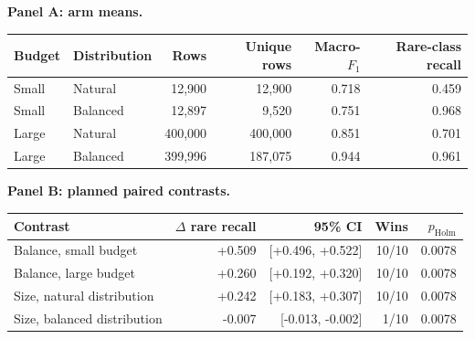 \begin{minipage}{\linewidth}
\centering
\textbf{Panel A: arm means.}\\[3pt]
\begin{tabular}{@{}llrrrr@{}}
\toprule
Budget & Distribution & Rows & Unique rows & Macro-$F_1$ & Rare-class recall \\
\midrule
Small & Natural & 12,900 & 12,900 & 0.718 & 0.459 \\
Small & Balanced & 12,897 & 9,520 & 0.751 & 0.968 \\
Large & Natural & 400,000 & 400,000 & 0.851 & 0.701 \\
Large & Balanced & 399,996 & 187,075 & 0.944 & 0.961 \\
\bottomrule
\end{tabular}
\par\medskip
\textbf{Panel B: planned paired contrasts.}\\[3pt]
\begin{tabular}{@{}lrrrr@{}}
\toprule
Contrast & $\Delta$ rare recall & 95\% CI & Wins & $p_{\mathrm{Holm}}$ \\
\midrule
Balance, small budget & +0.509 & [+0.496, +0.522] & 10/10 & 0.0078 \\
Balance, large budget & +0.260 & [+0.192, +0.320] & 10/10 & 0.0078 \\
Size, natural distribution & +0.242 & [+0.183, +0.307] & 10/10 & 0.0078 \\
Size, balanced distribution & -0.007 & [-0.013, -0.002] & 1/10 & 0.0078 \\
\bottomrule
\end{tabular}
\end{minipage}